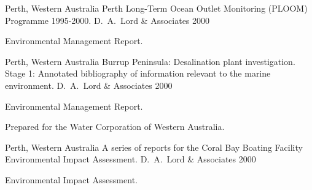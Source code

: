 


\begin{cventries}


\cventry
{Perth, Western Australia} %
{Perth Long-Term Ocean Outlet Monitoring (PLOOM) Programme 1995-2000.} %
{D.~A.~Lord \& Associates} %
{2000} %
{ %
\begin{cvitems}
\item {Environmental Management Report.}
\end{cvitems} 
}


\cventry
{Perth, Western Australia} %
{Burrup Peninsula: Desalination plant investigation. Stage 1:  Annotated bibliography of information relevant to the marine environment.} %
{D.~A.~Lord \& Associates} %
{2000} %
{ %
\begin{cvitems}
\item {Environmental Management Report.}
\item Prepared for the Water Corporation of Western Australia.
\end{cvitems} 
}


\cventry
{Perth, Western Australia} %
{A series of reports for the Coral Bay Boating Facility Environmental Impact Assessment.} %
{D.~A.~Lord \& Associates} %
{2000} %
{ %
\begin{cvitems}
\item {Environmental Impact Assessment.}
\end{cvitems} 
}



\end{cventries}
